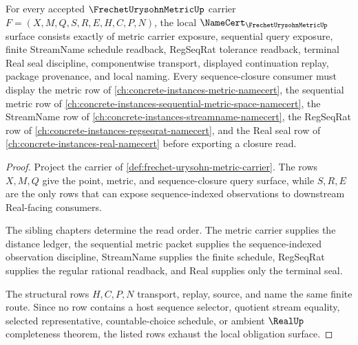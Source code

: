 \begin{theorem}
\label{thm:frechet-urysohn-metric-namecert-obligations}
For every accepted $\FrechetUrysohnMetricUp$ carrier $F=(X,M,Q,S,R,E,H,C,P,N)$, the local $\NameCert_{\FrechetUrysohnMetricUp}$ surface consists exactly of metric carrier exposure, sequential query exposure, finite StreamName schedule readback, RegSeqRat tolerance readback, terminal Real seal discipline, componentwise transport, displayed continuation replay, package provenance, and local naming. Every sequence-closure consumer must display the metric row of \autoref{ch:concrete-instances-metric-namecert}, the sequential metric row of \autoref{ch:concrete-instances-sequential-metric-space-namecert}, the StreamName row of \autoref{ch:concrete-instances-streamname-namecert}, the RegSeqRat row of \autoref{ch:concrete-instances-regseqrat-namecert}, and the Real seal row of \autoref{ch:concrete-instances-real-namecert} before exporting a closure read.
\end{theorem}
\begin{proof}
Project the carrier of \autoref{def:frechet-urysohn-metric-carrier}. The rows $X,M,Q$ give the point, metric, and sequence-closure query surface, while $S,R,E$ are the only rows that can expose sequence-indexed observations to downstream Real-facing consumers.

The sibling chapters determine the read order. The metric carrier supplies the distance ledger, the sequential metric packet supplies the sequence-indexed observation discipline, StreamName supplies the finite schedule, RegSeqRat supplies the regular rational readback, and Real supplies only the terminal seal.

The structural rows $H,C,P,N$ transport, replay, source, and name the same finite route. Since no row contains a host sequence selector, quotient stream equality, selected representative, countable-choice schedule, or ambient $\RealUp$ completeness theorem, the listed rows exhaust the local obligation surface.
\end{proof}


